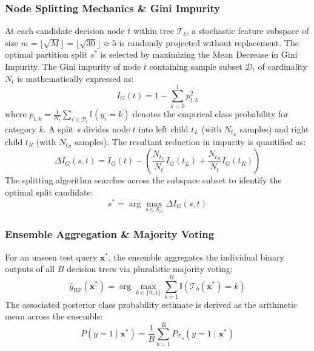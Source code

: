 \subsubsection{Node Splitting Mechanics \& Gini Impurity}
At each candidate decision node $t$ within tree $\mathcal{T}_b$, a stochastic feature subspace of size $m = \lfloor\sqrt{M}\rfloor = \lfloor\sqrt{30}\rfloor \approx 5$ is randomly projected without replacement. The optimal partition split $s^*$ is selected by maximizing the Mean Decrease in Gini Impurity. The Gini impurity of node $t$ containing sample subset $\mathcal{D}_t$ of cardinality $N_t$ is mathematically expressed as:
\begin{equation}
    I_G(t) = 1 - \sum_{k=0}^{1} p_{t,k}^2
    \label{eq:gini_impurity}
\end{equation}
where $p_{t,k} = \frac{1}{N_t} \sum_{i \in \mathcal{D}_t} \mathbb{I}(y_i = k)$ denotes the empirical class probability for category $k$. A split $s$ divides node $t$ into left child $t_L$ (with $N_{t_L}$ samples) and right child $t_R$ (with $N_{t_R}$ samples). The resultant reduction in impurity is quantified as:
\begin{equation}
    \Delta I_G(s, t) = I_G(t) - \left( \frac{N_{t_L}}{N_t} I_G(t_L) + \frac{N_{t_R}}{N_t} I_G(t_R) \right)
    \label{eq:gini_reduction}
\end{equation}
The splitting algorithm searches across the subspace subset to identify the optimal split candidate:
\begin{equation}
    s^* = \arg\max_{s \in \mathcal{S}_m} \Delta I_G(s, t)
    \label{eq:optimal_split}
\end{equation}

\subsubsection{Ensemble Aggregation \& Majority Voting}
For an unseen test query $\mathbf{x}^*$, the ensemble aggregates the individual binary outputs of all $B$ decision trees via pluralistic majority voting:
\begin{equation}
    \hat{y}_{\text{RF}}(\mathbf{x}^*) = \arg\max_{k \in \{0, 1\}} \sum_{b=1}^B \mathbb{I}\left( \mathcal{T}_b(\mathbf{x}^*) = k \right)
    \label{eq:majority_voting}
\end{equation}
The associated posterior class probability estimate is derived as the arithmetic mean across the ensemble:
\begin{equation}
    P\left(y = 1 \mid \mathbf{x}^*\right) = \frac{1}{B} \sum_{b=1}^B P_{\mathcal{T}_b}\left(y = 1 \mid \mathbf{x}^*\right)
    \label{eq:prob_estimate}
\end{equation}

